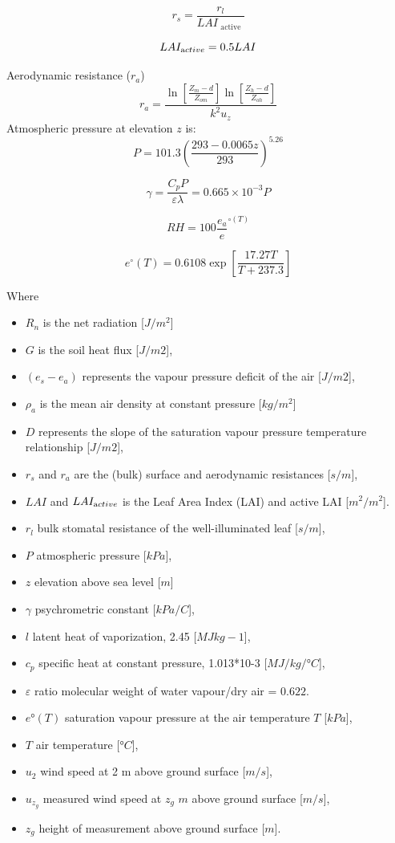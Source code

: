 \documentclass[]{scrbook}
\providecommand{\tightlist}{%
  \setlength{\itemsep}{0pt}\setlength{\parskip}{0pt}}
\begin{document}
\[r_{s}=\frac{r_{l}}{LAI_{\text { active }}}\]

\[LAI_{\text active} = 0.5 LAI\]

Aerodynamic resistance (\(r_a\))
\[r_{a}=\frac{\ln \left[\frac{Z_{m}-d}{Z_{o m}}\right] \ln \left[\frac{Z_{h}-d}{Z_{o h}}\right]}{k^{2} u_{z}}\]
Atmospheric pressure at elevation \(z\) is:
\[P=101.3\left(\frac{293-0.0065 z}{293}\right)^{5.26}\]

\[ \gamma =\frac{C_{p} P}{\varepsilon \lambda}=0.665 \times 10^{-3} P \]

\[RH=100 \frac{{e}_{a}}{e}^{\circ(T)}\]

\[ e^{\circ}(T)=0.6108 \operatorname{exp}\left[ \frac{17.27 T}{{T}+237.3}\right] \]

Where

\begin{itemize}
\tightlist
\item
  \(R_n\) is the net radiation {[}\(J/m^2\){]}
\item
  \(G\) is the soil heat flux {[}\(J/m2\){]},
\item
  \((e_s - e_a)\) represents the vapour pressure deficit of the air
  {[}\(J/m2\){]},
\item
  \(\rho_a\) is the mean air density at constant pressure
  {[}\(kg/m^2\){]}
\item
  \(D\) represents the slope of the saturation vapour pressure
  temperature relationship {[}\(J/m2\){]},
\item
  \(r_s\) and \(r_a\) are the (bulk) surface and aerodynamic resistances
  {[}\(s/m\){]},
\item
  \(LAI\) and \(LAI_{\text active}\) is the Leaf Area Index (LAI) and
  active LAI {[}\(m^2/m^2\){]}.
\item
  \(r_l\) bulk stomatal resistance of the well-illuminated leaf
  {[}\(s/m\){]},
\item
  \(P\) atmospheric pressure {[}\(kPa\){]},
\item
  \(z\) elevation above sea level {[}\(m\){]}
\item
  \(\gamma\) psychrometric constant {[}\(kPa/C\){]},
\item
  \(l\) latent heat of vaporization, 2.45 {[}\(MJ kg-1\){]},
\item
  \(c_p\) specific heat at constant pressure, 1.013*10-3
  {[}\(MJ/kg/°C\){]},
\item
  \(\varepsilon\) ratio molecular weight of water vapour/dry air =
  \(0.622\).
\item
  \(e°(T)\) saturation vapour pressure at the air temperature \(T\)
  {[}\(kPa\){]},
\item
  \(T\) air temperature {[}\(°C\){]},
\item
  \(u_2\) wind speed at 2 m above ground surface {[}\(m/s\){]},
\item
  \(u_{z_g}\) measured wind speed at \(z_g\) \(m\) above ground surface
  {[}\(m/s\){]},
\item
  \(z_g\) height of measurement above ground surface {[}\(m\){]}.
\end{itemize}
\end{document}
